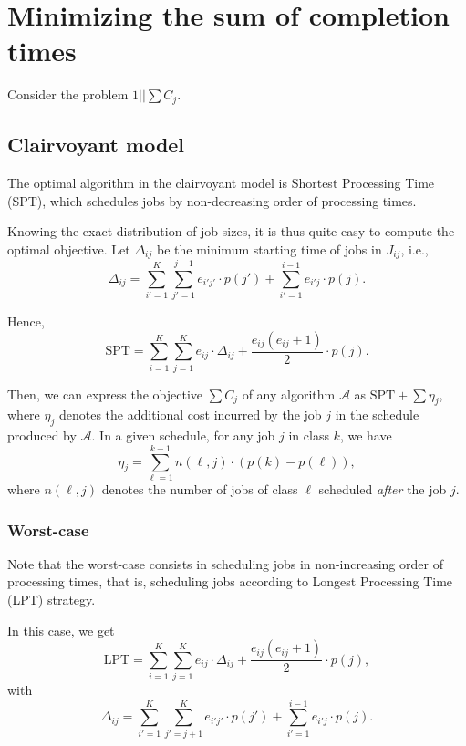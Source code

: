 \documentclass{article}
\begin{document}

\section{Minimizing the sum of completion times}

Consider the problem \(1||\sum C_j\).

\subsection{Clairvoyant model}

The optimal algorithm in the clairvoyant model is Shortest Processing Time (SPT), which schedules jobs by non-decreasing order of processing times.

Knowing the exact distribution of job sizes, it is thus quite easy to compute the optimal objective.
Let \(\Delta_{ij}\) be the minimum starting time of jobs in \(J_{ij}\), i.e.,
\[
    \Delta_{ij}=\sum_{i'=1}^{K} \sum_{j'=1}^{j-1} e_{i'j'} \cdot p(j') + \sum_{i'=1}^{i-1} e_{i'j} \cdot p(j).
\]

Hence,
\[
    \text{SPT}=\sum_{i=1}^{K} \sum_{j=1}^{K} e_{ij} \cdot \Delta_{ij} + \frac{e_{ij}(e_{ij}+1)}{2} \cdot p(j).
\]

Then, we can express the objective \(\sum C_j\) of any algorithm \(\mathcal{A}\) as \(\text{SPT}+\sum \eta_j\),
where \(\eta_j\) denotes the additional cost incurred by the job \(j\) in the schedule produced by \(\mathcal{A}\).
In a given schedule, for any job \(j\) in class \(k\), we have
\[
    \eta_j=\sum_{\ell=1}^{k-1} n(\ell,j)\cdot (p(k)-p(\ell)),
\]
where \(n(\ell,j)\) denotes the number of jobs of class \(\ell\) scheduled \emph{after} the job \(j\).

\subsubsection{Worst-case}

Note that the worst-case consists in scheduling jobs in non-increasing order of processing times, that is, scheduling jobs according to Longest Processing Time (LPT) strategy.

In this case, we get
\[
    \text{LPT}=\sum_{i=1}^{K} \sum_{j=1}^{K} e_{ij} \cdot \Delta_{ij} + \frac{e_{ij}(e_{ij}+1)}{2} \cdot p(j),
\]
with
\[
    \Delta_{ij}=\sum_{i'=1}^{K} \sum_{j'=j+1}^{K} e_{i'j'} \cdot p(j') + \sum_{i'=1}^{i-1} e_{i'j} \cdot p(j).
\]
\end{document}
